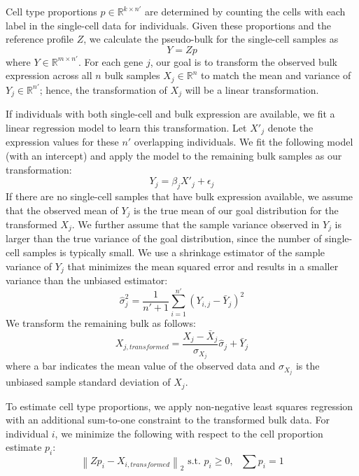 Cell type proportions $p \in \mathbb{R}^{k \times n'}$ are determined by counting the cells with each label in the single-cell data for  individuals. Given these proportions and the reference profile $Z$, we calculate the pseudo-bulk for the single-cell samples as 
\begin{equation}
    Y=Zp
\end{equation}
where $Y \in \mathbb{R}^{m \times n'}$. For each gene $j$, our goal is to transform the observed bulk expression across all $n$ bulk samples $X_j \in \mathbb{R}^n$ to match the mean and variance of $Y_j \in \mathbb{R}^{n'}$; hence, the transformation of $X_j$ will be a linear transformation. 

If individuals with both single-cell and bulk expression are available, we fit a linear regression model to learn this transformation. Let $X'_j$ denote the expression values for these $n'$ overlapping individuals. We fit the following model (with an intercept) and apply the model to the remaining bulk samples as our transformation:
\begin{equation}
	Y_j = \beta_jX'_j + \epsilon_j
\end{equation}
If there are no single-cell samples that have bulk expression available, we assume that the observed mean of $Y_j$ is the true mean of our goal distribution for the transformed $X_j$. We further assume that the sample variance observed in $Y_j$ is larger than the true variance of the goal distribution, since the number of single-cell samples is typically small. We use a shrinkage estimator of the sample variance of $Y_j$ that minimizes the mean squared error and results in a smaller variance than the unbiased estimator:
\begin{equation}
	\hat{\sigma}^2_j = \frac{1}{n' + 1} \sum_{i=1}^{n'}(Y_{i,j} - \bar{Y}_j)^2
\end{equation}
We transform the remaining bulk as follows:
\begin{equation}
	X_{j,transformed} = \frac{X_j - \bar{X}_j}{\sigma_{X_j}} \hat{\sigma}_j + \bar{Y}_j
\end{equation}
where a bar indicates the mean value of the observed data and $\sigma_{X_j}$ is the unbiased sample standard deviation of  $X_j$.

To estimate cell type proportions, we apply non-negative least squares regression with an additional sum-to-one constraint to the transformed bulk data. For individual $i$, we minimize the following with respect to the cell proportion estimate $p_i$:
\begin{equation}
    \left\lVert Zp_i - X_{i,transformed} \right\rVert_2 \text{ s.t. } p_i \geq 0,\text{ } \sum p_i = 1 
\end{equation}

